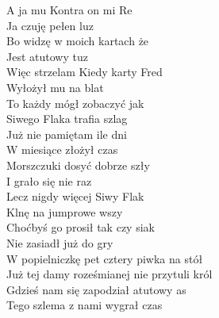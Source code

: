 A ja mu Kontra on mi Re \\
Ja czuję pełen luz \\
Bo widzę w moich kartach że \\
Jest atutowy tuz \\
Więc strzelam Kiedy karty Fred \\
Wyłożył mu na blat \\
To każdy mógł zobaczyć jak \\
Siwego Flaka trafia szlag \\

Już nie pamiętam ile dni \\
W miesiące złożył czas \\
Morszczuki dosyć dobrze szły \\
I grało się nie raz \\
Lecz nigdy więcej Siwy Flak \\
Klnę na jumprowe wszy \\
Choćbyś go prosił tak czy siak \\
Nie zasiadł już do gry \\

W popielniczkę pet cztery piwka na stół \\
Już tej damy roześmianej nie przytuli król \\
Gdzieś nam się zapodział atutowy as \\
Tego szlema z nami wygrał czas